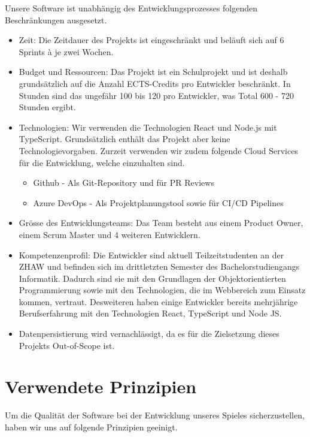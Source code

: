 \documentclass[11pt,a4paper,german]{scrartcl}
\let\oldsection\section
\renewcommand\section{\clearpage\oldsection}
\begin{document}
Unsere Software ist unabhängig des Entwicklungsprozesses folgenden Beschränkungen ausgesetzt.
\begin{itemize}
  \item Zeit: Die Zeitdauer des Projekts ist eingeschränkt und beläuft sich auf 6 Sprints à je zwei Wochen.
  \item Budget und Ressourcen: Das Projekt ist ein Schulprojekt und ist deshalb grundsätzlich auf die Anzahl ECTS-Credits pro Entwickler beschränkt. In Stunden sind das ungefähr 100 bis 120 pro Entwickler, was Total 600 - 720 Stunden ergibt.
  \item Technologien: Wir verwenden die Technologien React und Node.js mit TypeScript. Grundsätzlich enthält das Projekt aber keine Technologievorgaben. Zurzeit verwenden wir zudem folgende Cloud Services für die Entwicklung, welche einzuhalten sind.
        \begin{itemize}
          \item Github - Als Git-Repository und für PR Reviews
          \item Azure DevOps - Als Projektplanungstool sowie für CI/CD Pipelines
        \end{itemize}
  \item Grösse des Entwicklungsteams: Das Team besteht aus einem Product Owner, einem Scrum Master und 4 weiteren Entwicklern.
  \item Kompetenzenprofil: Die Entwickler sind aktuell Teilzeitstudenten an der ZHAW und befinden sich im drittletzten Semester des Bachelorstudiengangs Informatik. Dadurch sind sie mit den Grundlagen der Objektorientierten Programmierung sowie mit den Technologien, die im Webbereich zum Einsatz kommen, vertraut. Desweiteren haben einige Entwickler bereits mehrjährige Berufserfahrung mit den Technologien React, TypeScript und Node JS.
  \item Datenpersistierung wird vernachlässigt, da es für die Zielsetzung dieses Projekts Out-of-Scope ist.
\end{itemize}

\section{Verwendete Prinzipien}
Um die Qualität der Software bei der Entwicklung unseres Spieles sicherzustellen, haben wir uns auf folgende Prinzipien geeinigt.
\end{document}
